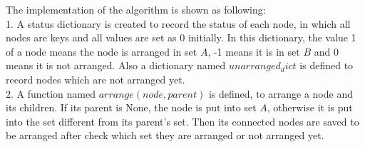 \documentclass[a4paper,11pt]{article}
\begin{document}
The implementation of the algorithm is shown as following: \\
1. A status dictionary is created to record the status of each node, in which all nodes are keys and all values are set as 0 initially. In this dictionary, the value 1 of a node means the node is arranged in set $A$, -1 means it is in set $B$ and 0 means it is not arranged. Also a dictionary named $unarranged_dict$ is defined to record nodes which are not arranged yet. \\

2. A function named $arrange(node, parent)$ is defined, to arrange a node and its children. If its parent is None, the node is put into set $A$, otherwise it is put into the set different from its parent's set. Then its connected nodes are saved to be arranged after check which set they are arranged or not arranged yet. \\
\end{document}
